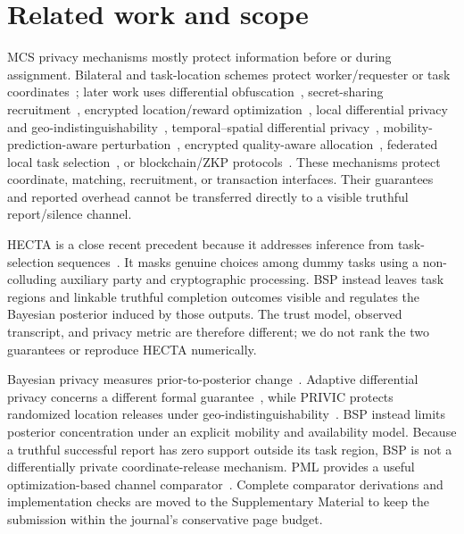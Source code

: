 \documentclass[review,11pt,times]{elsarticle}
\begin{document}
\section{Related work and scope}
\label{sec:related}
MCS privacy mechanisms mostly protect information before or during assignment. Bilateral and task-location schemes protect worker/requester or task coordinates~\cite{itam2021,taskloc2022}; later work uses differential obfuscation~\cite{pmta2024}, secret-sharing recruitment~\cite{ppur2024}, encrypted location/reward optimization~\cite{lrppsta2025}, local differential privacy and geo-indistinguishability~\cite{mtadprh2025}, temporal--spatial differential privacy~\cite{tasp2025}, mobility-prediction-aware perturbation~\cite{p2taskmp2025}, encrypted quality-aware allocation~\cite{qpta2024}, federated local task selection~\cite{fedsense2025}, or blockchain/ZKP protocols~\cite{blockchainpmc2026}. These mechanisms protect coordinate, matching, recruitment, or transaction interfaces. Their guarantees and reported overhead cannot be transferred directly to a visible truthful report/silence channel.

HECTA is a close recent precedent because it addresses inference from task-selection sequences~\cite{inference2026}. It masks genuine choices among dummy tasks using a non-colluding auxiliary party and cryptographic processing. BSP instead leaves task regions and linkable truthful completion outcomes visible and regulates the Bayesian posterior induced by those outputs. The trust model, observed transcript, and privacy metric are therefore different; we do not rank the two guarantees or reproduce HECTA numerically.

Bayesian privacy measures prior-to-posterior change~\cite{bayesian}. Adaptive differential privacy concerns a different formal guarantee~\cite{adaptive2023}, while PRIVIC protects randomized location releases under geo-indistinguishability~\cite{privic2024}. BSP instead limits posterior concentration under an explicit mobility and availability model. Because a truthful successful report has zero support outside its task region, BSP is not a differentially private coordinate-release mechanism. PML provides a useful optimization-based channel comparator~\cite{pml2024}. Complete comparator derivations and implementation checks are moved to the Supplementary Material to keep the submission within the journal's conservative page budget.
\end{document}
